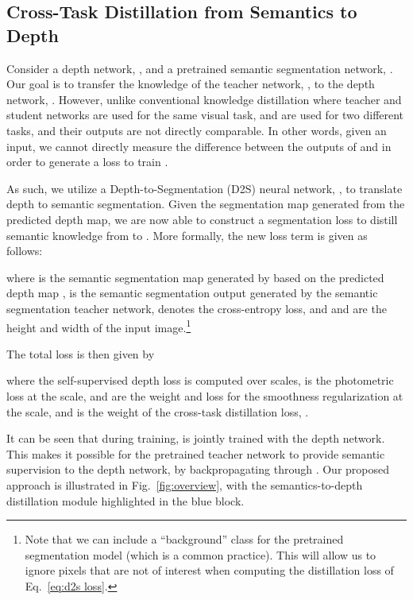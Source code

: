 \documentclass{bmvc2k}
\newcommand{\rev}{}
\begin{document}
\vspace{-10pt}
\subsection{Cross-Task Distillation from Semantics to Depth}\label{sec:semantic distillation}
\vspace{-6pt}
Consider a depth network, , and a pretrained semantic segmentation network, . Our goal is to transfer the knowledge of the teacher network, , to the depth network, . However, unlike conventional knowledge distillation where teacher and student networks are used for the same visual task,  and  are used for two different tasks, and their outputs are not directly comparable. In other words, given an input, we cannot directly measure the difference between the outputs of  and  in order to generate a loss to train .

As such, we utilize a Depth-to-Segmentation (D2S) neural network, , to translate depth to semantic segmentation. Given the segmentation map generated from the predicted depth map, we are now able to construct a segmentation loss to distill semantic knowledge from  to . More formally, the new loss term is given as follows:\vspace{-7pt}

where  is the semantic segmentation map generated by  based on the predicted depth map ,  is the semantic segmentation output generated by the semantic segmentation teacher network,  denotes the cross-entropy loss, and  and  are the height and width of the input image.\footnote{\rev{Note that we can include a ``background'' class for the pretrained segmentation model (which is a common practice). This will allow us to ignore pixels that are not of interest when computing the distillation loss of Eq.~\ref{eq:d2s loss}}.}

The total loss is then given by \vspace{-5pt}

where the self-supervised depth loss is computed over  scales,  is the photometric loss at the  scale,  and  are the weight and loss for the smoothness regularization at the  scale, and  is the weight of the cross-task distillation loss, .

It can be seen that during training,  is jointly trained with the depth network. This makes it possible for the pretrained teacher network to provide semantic supervision to the depth network, by backpropagating through . Our proposed approach is illustrated in Fig.~\ref{fig:overview}, with the semantics-to-depth distillation module highlighted in the blue block.
\end{document}
